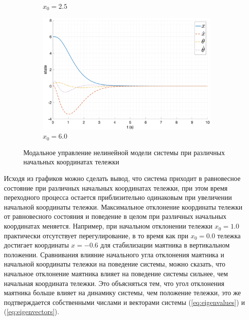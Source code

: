 \begin{figure}[ht!]
\begin{subfigure}[b]{0.45\textwidth}
        \caption{$x_0 = 2.5$}
    \end{subfigure}
    \begin{subfigure}[b]{0.45\textwidth}
        \includegraphics[width=\textwidth]{media/plots/modal_control_initials/state_6.png}
        \caption{$x_0 = 6.0$}
    \end{subfigure}
    \caption{Модальное управление нелинейной модели системы при различных начальных координатах тележки}
    \label{fig:modal_control_initials_x}
\end{figure}

Исходя из графиков можно сделать вывод, что система приходит в равновесное состояние при различных начальных координатах тележки, 
при этом время переходного процесса остается приблизительно одинаковым при увеличении начальной координаты тележки. Максимальное 
отклонение координаты тележки от равновесного состояния и поведение в целом при различных начальных координатах меняется. Например, 
при начальном отклонении тележки $x_0 = 1.0$ практически отсутствует перегулирование, в то время как при $x_0 = 0.0$ тележка 
достигает координаты $x = -0.6$ для стабилизации маятника в вертикальном положении. Сравнивания влияние начального угла отклонения маятника
и начальной координаты тележки на поведение системы, можно сказать, что начальное отклонение маятника влияет на поведение системы
сильнее, чем начальная координата тележки. Это объясняться тем, что угол отклонения маятника больше влияет на динамику системы, чем положение тележки,
это же подтверждается собственными числами и векторами системы (\ref{eq:eigenvalues}) и (\ref{eq:eigenvectors}). 


